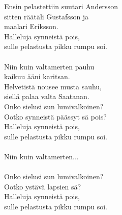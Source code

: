 
Ensin pelastettiin suutari Andersson \\ sitten räätäli Gustafsson ja \\ maalari Eriksson. \\ Halleluja synneistä pois, \\ sulle pelastusta pikku rumpu soi. \\ \hspace{10mm} \\ Niin kuin valtamerten pauhu \\ kaikuu ääni karitsan. \\ Helvetistä nousee musta sauhu, \\ siellä palaa valta Saatanan. \\ Onko sielusi sun lumivalkoinen? \\ Ootko synneistä päässyt sä pois? \\ Halleluja synneistä pois, \\ sulle pelastusta pikku rumpu soi. \\ \hspace{10mm} \\ Niin kuin valtamerten... \\ \hspace{10mm} \\ Onko sielusi sun lumivalkoinen? \\ Ootko ystävä lapsien sä? \\ Halleluja synneistä pois, \\ sulle pelastusta pikku rumpu soi.